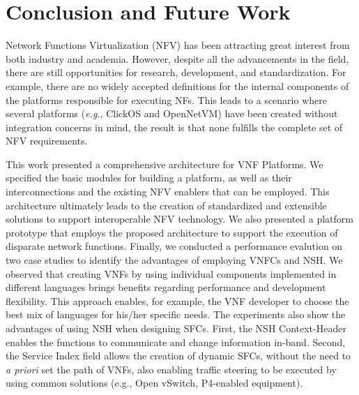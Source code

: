 \section{Conclusion and Future Work}

Network Functions Virtualization (NFV) has been attracting great interest from both industry and academia. However, despite all the advancements in the field, there are still opportunities for research, development, and standardization. For example, there are no widely accepted definitions for the internal components of the platforms responsible for executing  NFs. This leads to a scenario where several platforms (\textit{e.g.}, ClickOS and OpenNetVM) have been created without integration concerns in mind, the result is that none fulfills the complete set of NFV requirements.


This work presented a comprehensive architecture for VNF Platforms. We specified the basic modules for building a platform, as well as their interconnections and the existing NFV enablers that can be employed. This architecture ultimately leads to the creation of standardized and extensible solutions to support interoperable NFV technology. We also presented a platform prototype that employs the proposed architecture to support the execution of disparate network functions. Finally, we conducted a performance evalution on two case studies to identify the advantages of employing VNFCs and NSH. We observed that creating VNFs by using individual components implemented in different languages brings benefits regarding performance and development flexibility. This approach enables, for example, the VNF developer to choose the best mix of languages for his/her specific needs. The experiments also show the advantages of using NSH when designing SFCs. First, the NSH Context-Header enables the functions to communicate and change information in-band. Second, the Service Index field allows the creation of dynamic SFCs, without the need to \textit{a priori} set the path of VNFs, also enabling traffic steering to be executed by using common solutions (e.g., Open vSwitch, P4-enabled equipment).

